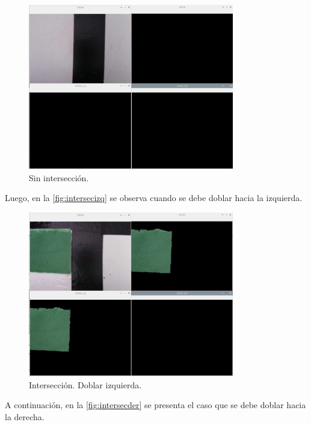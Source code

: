 \documentclass[11pt,a4paper]{article}
\begin{document}
	\begin{figure}[h!]
		\centering
		\includegraphics[width=0.8\textwidth]{imagenes/intersec_sin_cuad}
		\caption{Sin intersección.}
		\label{fig:intersecsincuad}
	\end{figure}
	
	\pagebreak
	
	Luego, en la \autoref*{fig:intersecizq} se observa cuando se debe doblar hacia la izquierda.
	
	\begin{figure}[h!]
		\centering
		\includegraphics[width=0.8\textwidth]{imagenes/intersec_izq}
		\caption{Intersección. Doblar izquierda.}
		\label{fig:intersecizq}
	\end{figure}
	
	A continuación, en la \autoref*{fig:intersecder} se presenta el caso que se debe doblar hacia la derecha.
	
\end{document}
